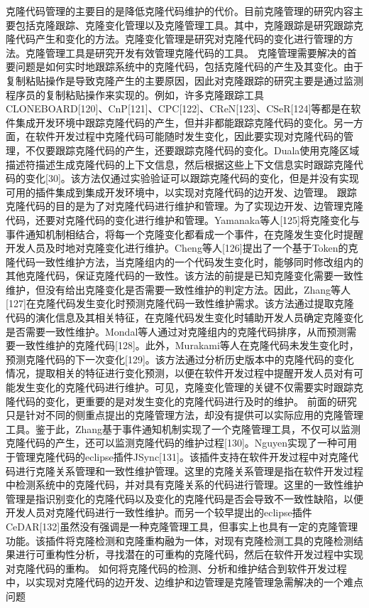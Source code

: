 
克隆代码管理的主要目的是降低克隆代码维护的代价。目前克隆管理的研究内容主要包括克隆跟踪、克隆变化管理以及克隆管理工具。其中，克隆跟踪是研究跟踪克隆代码产生和变化的方法。克隆变化管理是研究对克隆代码的变化进行管理的方法。克隆管理工具是研究开发有效管理克隆代码的工具。
克隆管理需要解决的首要问题是如何实时地跟踪系统中的克隆代码，包括克隆代码的产生及其变化。由于复制粘贴操作是导致克隆产生的主要原因，因此对克隆跟踪的研究主要是通过监测程序员的复制粘贴操作来实现的。例如，许多克隆跟踪工具CLONEBOARD[120]、CnP[121]、CPC[122]、CReN[123]、CSeR[124]等都是在软件集成开发环境中跟踪克隆代码的产生，但并非都能跟踪克隆代码的变化。另一方面，在软件开发过程中克隆代码可能随时发生变化，因此要实现对克隆代码的管理，不仅要跟踪克隆代码的产生，还要跟踪克隆代码的变化。Duala使用克隆区域描述符描述生成克隆代码的上下文信息，然后根据这些上下文信息实时跟踪克隆代码的变化[30]。该方法仅通过实验验证可以跟踪克隆代码的变化，但是并没有实现可用的插件集成到集成开发环境中，以实现对克隆代码的边开发、边管理。
跟踪克隆代码的目的是为了对克隆代码进行维护和管理。为了实现边开发、边管理克隆代码，还要对克隆代码的变化进行维护和管理。Yamanaka等人[125]将克隆变化与事件通知机制相结合，将每一个克隆变化都看成一个事件，在克隆发生变化时提醒开发人员及时地对克隆变化进行维护。Cheng等人[126]提出了一个基于Token的克隆代码一致性维护方法，当克隆组内的一个代码发生变化时，能够同时修改组内的其他克隆代码，保证克隆代码的一致性。该方法的前提是已知克隆变化需要一致性维护，但没有给出克隆变化是否需要一致性维护的判定方法。因此，Zhang等人[127]在克隆代码发生变化时预测克隆代码一致性维护需求。该方法通过提取克隆代码的演化信息及其相关特征，在克隆代码发生变化时辅助开发人员确定克隆变化是否需要一致性维护。Mondal等人通过对克隆组内的克隆代码排序，从而预测需要一致性维护的克隆代码[128]。此外，Murakami等人在克隆代码未发生变化时，预测克隆代码的下一次变化[129]。该方法通过分析历史版本中的克隆代码的变化情况，提取相关的特征进行变化预测，以便在软件开发过程中提醒开发人员对有可能发生变化的克隆代码进行维护。可见，克隆变化管理的关键不仅需要实时跟踪克隆代码的变化，更重要的是对发生变化的克隆代码进行及时的维护。
前面的研究只是针对不同的侧重点提出的克隆管理方法，却没有提供可以实际应用的克隆管理工具。鉴于此，Zhang基于事件通知机制实现了一个克隆管理工具，不仅可以监测克隆代码的产生，还可以监测克隆代码的维护过程[130]。Nguyen实现了一种可用于管理克隆代码的eclipse插件JSync[131]。该插件支持在软件开发过程中对克隆代码进行克隆关系管理和一致性维护管理。这里的克隆关系管理是指在软件开发过程中检测系统中的克隆代码，并对具有克隆关系的代码进行管理。这里的一致性维护管理是指识别变化的克隆代码以及变化的克隆代码是否会导致不一致性缺陷，以便开发人员对克隆代码进行一致性维护。而另一个较早提出的eclipse插件CeDAR[132]虽然没有强调是一种克隆管理工具，但事实上也具有一定的克隆管理功能。该插件将克隆检测和克隆重构融为一体，对现有克隆检测工具的克隆检测结果进行可重构性分析，寻找潜在的可重构的克隆代码，然后在软件开发过程中实现对克隆代码的重构。
如何将克隆代码的检测、分析和维护结合到软件开发过程中，以实现对克隆代码的边开发、边维护和边管理是克隆管理急需解决的一个难点问题



